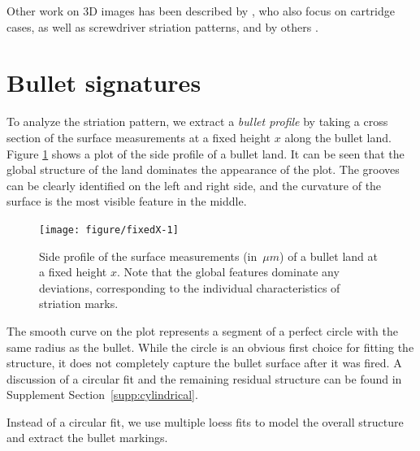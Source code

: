 \documentclass[aoas, preprint]{imsart}\usepackage[]{graphicx}\usepackage[]{color}
\newenvironment{knitrout}{}{} %
\begin{document}
Other work on 3D images has been described by \citet{petraco:2012}, who also focus on cartridge cases, as well as screwdriver striation patterns, and by others \citep[e.g.,][]{chu:2010, chu:2011, vorburger:2011}.

\section{Bullet signatures}

To analyze the striation pattern, we extract a \emph{bullet profile} \citep{ma:2004} by taking a cross section of the surface measurements at a fixed height $x$ along the bullet land.
Figure \ref{fig:fixedX} shows a plot of the side profile of a bullet land. It can be seen that the global structure of the land dominates the appearance of the plot. The grooves can be clearly identified on the left and right side, and the curvature of the surface is the most visible feature in the middle.

\begin{figure}[hbtp]
  \centering
\begin{knitrout}
\color{fgcolor}
\texttt{[image: figure/fixedX-1]} 

\end{knitrout}
\caption{\label{fig:fixedX}Side profile of the surface measurements (in~$\mu m$) of a bullet land at a fixed height $x$. Note that the global features dominate any deviations, corresponding to the individual characteristics of striation marks.}
\end{figure}

The smooth curve on the plot represents a segment of a perfect circle with the same radius as the bullet. While the circle is an obvious first choice for fitting the structure, it does not completely capture the bullet surface after it was fired. A discussion of a circular fit and the remaining residual structure can be found in Supplement Section~\ref{supp:cylindrical}.

Instead of a circular fit, we use multiple loess fits to model the overall structure and extract the bullet markings. 
\end{document}
